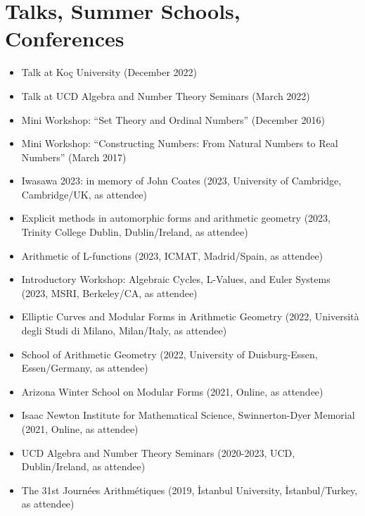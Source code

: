 \documentclass[letterpaper,11pt]{article}
\newcommand{\resumeItem}[1]{
  \item\small{
    {#1 \vspace{-2pt}}
  }
}
\newcommand{\resumeItemListStart}{\begin{itemize}}
\newcommand{\resumeItemListEnd}{\end{itemize}\vspace{-5pt}}
\begin{document}
\section{Talks, Summer Schools, Conferences}
  \resumeItemListStart
    \resumeItem {Talk at Koç University (December 2022)}
    \resumeItem {Talk at UCD Algebra and Number Theory Seminars (March 2022)}
    \resumeItem {Mini Workshop: ``Set Theory and Ordinal Numbers'' (December 2016)}
    \resumeItem {Mini Workshop: ``Constructing Numbers: From Natural Numbers to Real Numbers'' (March 2017)}
    \resumeItem {Iwasawa 2023: in memory of John Coates (2023, University of Cambridge, Cambridge/UK, as attendee)}
    \resumeItem {Explicit methods in automorphic forms and arithmetic geometry (2023, Trinity College Dublin, Dublin/Ireland, as attendee)}
    \resumeItem {Arithmetic of L-functions (2023, ICMAT, Madrid/Spain, as attendee)}
    \resumeItem {Introductory Workshop: Algebraic Cycles, L-Values, and Euler Systems (2023, MSRI, Berkeley/CA, as attendee)}
    \resumeItem {Elliptic Curves and Modular Forms in Arithmetic Geometry (2022, Universit\`{a} degli Studi di Milano, Milan/Italy, as attendee)}
    \resumeItem {School of Arithmetic Geometry (2022, University of Duisburg-Essen, Essen/Germany, as attendee)}
    \resumeItem {Arizona Winter School on Modular Forms (2021, Online, as attendee)}
    \resumeItem {Isaac Newton Institute for Mathematical Science, Swinnerton-Dyer Memorial (2021, Online, as attendee)}
    \resumeItem {UCD Algebra and Number Theory Seminars (2020-2023, UCD, Dublin/Ireland, as attendee)}
    \resumeItem {The 31st Journées Arithmétiques (2019, İstanbul University, İstanbul/Turkey, as attendee)}
  \resumeItemListEnd
 \vspace{-16pt}
\end{document}

